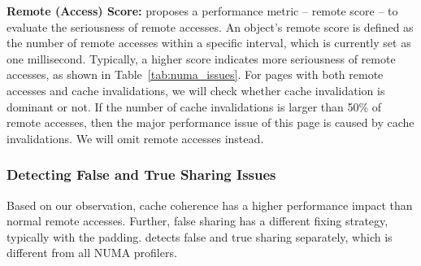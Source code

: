 \textbf{Remote (Access) Score:} \NP{}  proposes a performance metric -- remote  score -- to evaluate the seriousness of remote accesses. An object's remote score is defined as the number of remote accesses within a specific interval, which is currently set as one millisecond. Typically, a higher score indicates more seriousness of remote accesses, as shown in Table~\ref{tab:numa_issues}. 
For pages with both remote accesses and cache invalidations, we will check whether cache invalidation is dominant or not. If the number of cache invalidations is larger than 50\% of remote accesses, then the major performance issue of this page is caused by cache invalidations. We will omit remote accesses instead. 
 


   



\subsubsection{Detecting False and True Sharing Issues}
\label{sec: cacheline}

Based on our observation,  cache coherence has a higher performance impact than normal remote accesses. Further, false sharing has a different fixing strategy, typically with the padding. 
\NP{} detects false and true sharing separately, which is different from all NUMA profilers. 

